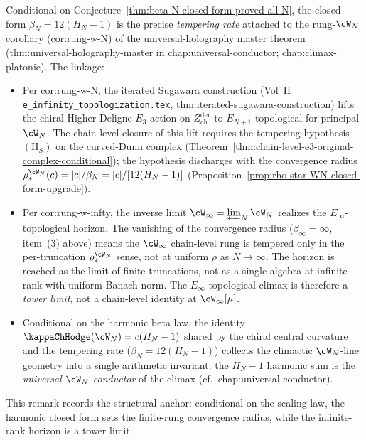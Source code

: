 \begin{remark}%
\label{rem:anchor-beta-N-rung-w-N-w-infty}%
%
%
%
Conditional on Conjecture~\ref{thm:beta-N-closed-form-proved-all-N},
the closed form $\beta_N = 12(H_N - 1)$ is the precise
\emph{tempering rate} attached to the rung-$\cW_N$ corollary
(\textsf{cor:rung-w-N}) of the universal-holography master theorem
(\textsf{thm:universal-holography-master} in
\textsf{chap:universal-conductor}; \textsf{chap:climax-platonic}). The
linkage:
\begin{itemize}[nosep]
\item Per \textsf{cor:rung-w-N}, the iterated Sugawara construction
 (Vol~II \texttt{e\_infinity\_topologization.tex},
 \textsf{thm:iterated-sugawara-construction}) lifts the chiral
 Higher-Deligne $E_3$-action on $Z^{\mathrm{der}}_{\mathrm{ch}}$ to
 $E_{N+1}$-topological for principal $\cW_N$. The chain-level
 closure of this lift requires the tempering hypothesis
 $(\mathrm{H}_S)$ on the curved-Dunn complex
 (Theorem~\ref{thm:chain-level-e3-original-complex-conditional}); the
 hypothesis discharges with the convergence radius
 $\rho_*^{\cW_N}(c) = |c|/\beta_N = |c|/[12(H_N - 1)]$
 (Proposition~\ref{prop:rho-star-WN-closed-form-upgrade}).
\item Per \textsf{cor:rung-w-infty}, the inverse limit
 $\cW_\infty = \varprojlim_N \cW_N$ realizes the $E_\infty$-topological
 horizon. The vanishing of the convergence radius
 ($\beta_\infty = \infty$, item~(3) above) means the $\cW_\infty$
 chain-level rung is tempered only in the per-truncation
 $\rho_*^{\cW_N}$ sense, not at uniform $\rho$ as $N \to \infty$. The
 horizon is reached as the limit of finite truncations, not as a
 single algebra at infinite rank with uniform Banach norm. The
 $E_\infty$-topological climax is therefore a \emph{tower limit}, not
 a chain-level identity at $\cW_\infty[\mu]$.
\item Conditional on the harmonic beta law, the identity
 $\kappaChHodge(\cW_N) = c(H_N - 1)$ shared by the chiral central curvature
 and the tempering rate
 ($\beta_N = 12(H_N - 1)$) collects the climactic
 $\cW_N$-line geometry into a single arithmetic invariant: the
 $H_N - 1$ harmonic sum is the \emph{universal $\cW_N$ conductor}
 of the climax (cf.\ \textsf{chap:universal-conductor}).
\end{itemize}
This remark records the structural anchor: conditional on the scaling
law, the harmonic closed form
sets the finite-rung convergence radius, while the infinite-rank
horizon is a tower limit.
\end{remark}

